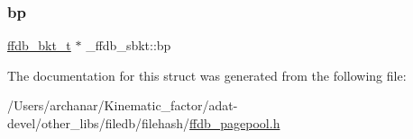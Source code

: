 \subsubsection{\texorpdfstring{bp}{bp}}
{\footnotesize\ttfamily \mbox{\hyperlink{adat-devel_2other__libs_2filedb_2filehash_2ffdb__pagepool_8h_a7d7436d10d66de8bbe2325c37cd7a5ef}{ffdb\+\_\+bkt\+\_\+t}} $\ast$ \+\_\+ffdb\+\_\+sbkt\+::bp}



The documentation for this struct was generated from the following file\+:\begin{DoxyCompactItemize}
\item 
/\+Users/archanar/\+Kinematic\+\_\+factor/adat-\/devel/other\+\_\+libs/filedb/filehash/\mbox{\hyperlink{adat-devel_2other__libs_2filedb_2filehash_2ffdb__pagepool_8h}{ffdb\+\_\+pagepool.\+h}}\end{DoxyCompactItemize}
